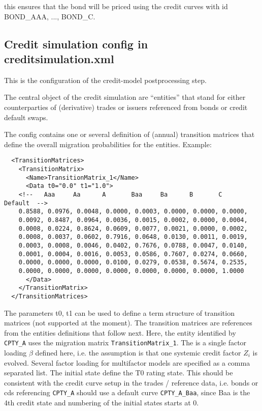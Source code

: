 \documentclass[12pt, a4paper]{article}
\begin{document}
this ensures that the bond will be priced using the credit curves with id BOND\_AAA, ..., BOND\_C.

\subsection{Credit simulation config in creditsimulation.xml}\label{credit_simulation_config}

This is the configuration of the credit-model postprocessing step.

The central object of the credit simulation are ``entities'' that stand for either counterparties of (derivative) trades
or issuers referenced from bonds or credit default swaps.

The config contains one or several definition of (annual) transition matrices that define the overall migration
probabilities for the entities. Example:

\begin{verbatim}
  <TransitionMatrices>
    <TransitionMatrix>
      <Name>TransitionMatrix_1</Name>
      <Data t0="0.0" t1="1.0">
    <!--   Aaa     Aa      A       Baa     Ba      B       C    Default  -->
	0.8588, 0.0976, 0.0048, 0.0000, 0.0003, 0.0000, 0.0000, 0.0000, 
	0.0092, 0.8487, 0.0964, 0.0036, 0.0015, 0.0002, 0.0000, 0.0004, 
	0.0008, 0.0224, 0.8624, 0.0609, 0.0077, 0.0021, 0.0000, 0.0002, 
	0.0008, 0.0037, 0.0602, 0.7916, 0.0648, 0.0130, 0.0011, 0.0019, 
	0.0003, 0.0008, 0.0046, 0.0402, 0.7676, 0.0788, 0.0047, 0.0140, 
	0.0001, 0.0004, 0.0016, 0.0053, 0.0586, 0.7607, 0.0274, 0.0660, 
	0.0000, 0.0000, 0.0000, 0.0100, 0.0279, 0.0538, 0.5674, 0.2535, 
	0.0000, 0.0000, 0.0000, 0.0000, 0.0000, 0.0000, 0.0000, 1.0000  
      </Data>
    </TransitionMatrix>
  </TransitionMatrices>
\end{verbatim}

The parameters t0, t1 can be used to define a term structure of transition matrices (not supported at the moment). The
transition matrices are references from the entities definitions that follow next. Here, the entity identified by
\verb+CPTY_A+ uses the migration matrix \verb+TransitionMatrix_1+. The is a single factor loading $\beta$ defined here,
i.e. the assumption is that one systemic credit factor $Z_i$ is evolved. Several factor loading for multifactor models
are specified as a comma separated list. The initial state define the T0 rating state. This should be consistent with
the credit curve setup in the trades / reference data, i.e. bonds or cds referencing \verb+CPTY_A+ should use a default
curve \verb+CPTY_A_Baa+, since Baa is the 4th credit state and numbering of the initial states starts at $0$.
\end{document}
